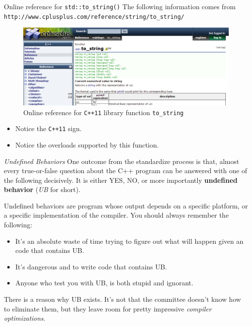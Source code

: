 \begin{frame}{Online reference for \texttt{std::to\_string()}}
The following information comes from \texttt{http://www.cplusplus.com/reference/string/to\_string/}
\begin{figure}
	\centering
	\includegraphics[scale=0.4]{fig/rc3_tostring}
	\caption{Online reference for \texttt{C++11} library function \texttt{to\_string}}
	\vspace{-0.2in}
\end{figure}

\begin{itemize}
	\item Notice the \texttt{C++11} sign.
	\item Notice the overloads supported by this function.
\end{itemize}
\end{frame}

\begin{frame}{\textit{Undefined Behaviors}}
One outcome from the standardize process is that, almost every true-or-false question about the C++ program can be answered with one of the following decisively. It is either YES, NO, or more importantly \textbf{undefined behavior} (\textit{UB} for short).

Undefined behaviors are program whose output depends on a specific platform, or a specific implementation of the compiler. You should always remember the following:
\begin{itemize}
	\item It's an absolute waste of time trying to figure out what will happen given an code that contains UB.
	\item It's dangerous and to write code that contains UB.
	\item Anyone who test you with UB, is both stupid and ignorant.
\end{itemize}

There is a reason why UB exists. It's not that the committee doesn't know how to eliminate them, but they leave room for pretty impressive \textit{compiler optimizations}.
\end{frame}

